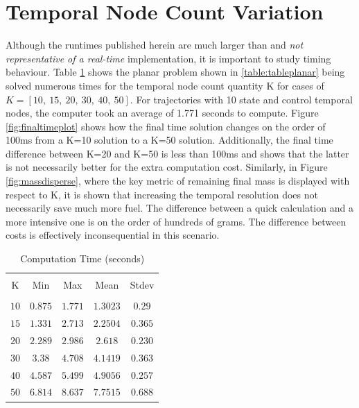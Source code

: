 \section{Temporal Node Count Variation}
Although the runtimes published herein are much larger than and \textit{not representative of a real-time} implementation, it is important to study timing behaviour. Table \ref{table:timingtable} shows the planar problem shown in \ref{table:tableplanar} being solved numerous times for the temporal node count quantity K for cases of $K = [10, \ 15, \ 20, \ 30, \ 40, \ 50]$. For trajectories with 10 state and control temporal nodes, the computer took an average of 1.771 seconds to compute. Figure \ref{fig:finaltimeplot} shows how the final time solution changes on the order of 100ms from a K=10 solution to a K=50 solution. Additionally, the final time difference between K=20 and K=50 is less than 100ms and shows that the latter is not necessarily better for the extra computation cost. Similarly, in Figure \ref{fig:massdisperse}, where the key metric of remaining final mass is displayed with respect to K, it is shown that increasing the temporal resolution does not necessarily save much more fuel. The difference between a quick calculation and a more intensive one is on the order of hundreds of grams. The difference between costs is effectively inconsequential in this scenario.


\begin{table}[ht]
\caption{Computation Time (seconds)}
\centering 
\begin{tabular}{c c c c c} 
\hline\hline \\[0.5ex] 
K & Min & Max & Mean & Stdev \\ 
\hline \\
$10$    &$0.875 $   &$1.771 $  &$1.3023  $  &$0.29$   \\ 
$15$    &$1.331 $   &$2.713 $  &$2.2504  $  &$0.365$  \\ 
$20$    &$2.289$    &$2.986$   &$2.618  $   &$0.230$  \\ 
$30$    &$ 3.38 $   &$4.708 $  &$4.1419  $  &$0.363$  \\ 
$40$    &$4.587 $   &$5.499 $  &$4.9056  $  &$0.257$  \\ 
$50$    &$6.814 $   &$8.637 $  &$7.7515  $  &$0.688$  \\[1ex] 
\hline
\end{tabular}
\label{table:timingtable}
\end{table}

